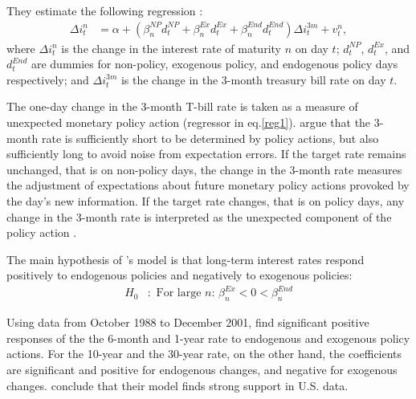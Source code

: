 \documentclass[11pt,a4paper,english,oneside]{book}
\numberwithin{equation}{chapter}
\begin{document}
They estimate the following regression \cite[~p. 13]{Ellingsen.2003}:
\begin{align}\label{reg1}
\Delta i^n_t &= \alpha + (\beta_n^{NP}d_t^{NP} + \beta_n^{Ex}d_t^{Ex} + \beta_n^{End}d_t^{End})\Delta i^{3m}_t + v_t^n,
\end{align}
where $\Delta i^n_t$ is the change in the interest rate of maturity $n$ on day $t$; $d_t^{NP}$, $d_t^{Ex}$, and $d_t^{End}$ are dummies for non-policy, exogenous policy, and endogenous policy days respectively; and $\Delta i^{3m}_t$ is the change in the 3-month treasury bill rate on day $t$.

The one-day change in the 3-month T-bill rate is taken as a measure of unexpected monetary policy action (regressor in eq.\ref{reg1}). \citet[~p. 13]{Ellingsen.2003} argue that the 3-month rate is sufficiently short to be determined by policy actions, but also sufficiently long to avoid noise from expectation errors. If the target rate remains unchanged, that is on non-policy days, the change in the 3-month rate measures the adjustment of expectations about future monetary policy actions provoked by the day's new information. If the target rate changes, that is on policy days, any change in the 3-month rate is interpreted as the unexpected component of the policy action \citep[~p. 12]{Ellingsen.2003}.

The main hypothesis of \citeauthor{Ellingsen.2003}'s model is that long-term interest rates respond positively to endogenous policies and negatively to exogenous policies:
\begin{align}\label{H0}
H_0&:  \text{ For large $n$: } \beta_n^{Ex}<0< \beta_n^{End}
\end{align}

%

Using data from October 1988 to December 2001, \citet[~p. 16]{Ellingsen.2003} find significant positive responses of the the 6-month and 1-year rate to endogenous and exogenous policy actions. For the 10-year and the 30-year rate, on the other hand, the coefficients are significant and positive for endogenous changes, and negative for exogenous changes. \citeauthor{Ellingsen.2003} conclude that their model finds strong support in U.S. data. 
\end{document}
